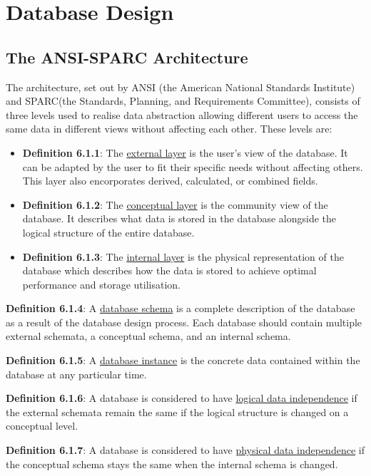 \documentclass{article}
\newcommand{\separate}[1] {\vspace{#1 pt}\noindent}
\newcommand{\definition}[2]{\textbf{Definition #1}: #2\label{def:#1}}
\begin{document}
\section{Database Design}

\subsection{The ANSI-SPARC Architecture}

The architecture, set out by ANSI (the American National Standards Institute) and SPARC(the Standards, Planning, and Requirements Committee), consists of three levels used to realise data abstraction allowing different users to access the same data in different views without affecting each other. These levels are:
\begin{itemize}
    \item \definition{6.1.1}{The \underline{external layer} is the user's view of the database. It can be adapted by the user to fit their specific needs without affecting others. This layer also encorporates derived, calculated, or combined fields.}
    \item \definition{6.1.2}{The \underline{conceptual layer} is the community view of the database. It describes what data is stored in the database alongside the logical structure of the entire database.}
    \item \definition{6.1.3}{The \underline{internal layer} is the physical representation of the database which describes how the data is stored to achieve optimal performance and storage utilisation.}
\end{itemize}

\separate{5}\definition{6.1.4}{A \underline{database schema} is a complete description of the database as a result of the database design process. Each database should contain multiple external schemata, a conceptual schema, and an internal schema.}

\separate{5}\definition{6.1.5}{A \underline{database instance} is the concrete data contained within the database at any particular time.}

\separate{5}\definition{6.1.6}{A database is considered to have \underline{logical data independence} if the external schemata remain the same if the logical structure is changed on a conceptual level.}

\separate{5}\definition{6.1.7}{A database is considered to have \underline{physical data independence} if the conceptual schema stays the same when the internal schema is changed.}
\end{document}
